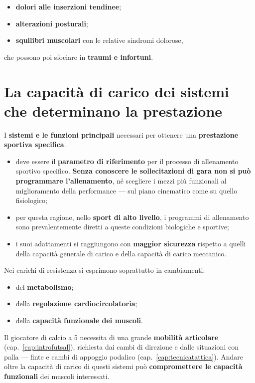 \begin{itemize}
  \item \textbf{dolori alle inserzioni tendinee};
  \item \textbf{alterazioni posturali};
  \item \textbf{squilibri muscolari} con le relative sindromi dolorose,
\end{itemize}
che possono poi sfociare in \textbf{traumi e infortuni}.

\section{La capacità di carico dei sistemi che determinano la prestazione}

I \textbf{sistemi e le funzioni principali} necessari per ottenere una \textbf{prestazione sportiva
specifica}.

\begin{itemize}
  \item deve essere il \textbf{parametro di riferimento} per il processo di allenamento sportivo
    specifico. \textbf{Senza conoscere le sollecitazioni di gara non si può programmare
    l'allenamento}, né scegliere i mezzi più funzionali al miglioramento della performance --- sul
    piano cinematico come su quello fisiologico;
  \item per questa ragione, nello \textbf{sport di alto livello}, i programmi di allenamento sono
    prevalentemente diretti a queste condizioni biologiche e sportive;
  \item i suoi adattamenti si raggiungono con \textbf{maggior sicurezza} rispetto a quelli della
    capacità generale di carico e della capacità di carico meccanico.
\end{itemize}

Nei carichi di resistenza si esprimono soprattutto in cambiamenti:
\begin{itemize}
  \item del \textbf{metabolismo};
  \item della \textbf{regolazione cardiocircolatoria};
  \item della \textbf{capacità funzionale dei muscoli}.
\end{itemize}

Il giocatore di calcio a 5 necessita di una grande \textbf{mobilità articolare}
(cap.~\ref{cap:introfutsal}), richiesta dai cambi di direzione e dalle situazioni con palla ---
finte e cambi di appoggio podalico (cap.~\ref{cap:tecnicatattica}). Andare oltre la capacità di
carico di questi sistemi può \textbf{compromettere le capacità funzionali} dei muscoli interessati.

